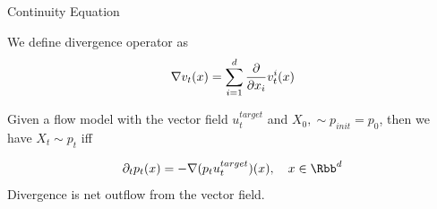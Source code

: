 \documentclass[aspectratio=169,xcolor=dvipsnames,svgnames,x11names,fleqn]{beamer}
\begin{document}
\begin{frame}{Continuity Equation}

    We define divergence operator as
    \begin{align*}
        \nabla v_t(x) = \sum_{i=1}^d \pdv{}{x_i} v_t^i(x)
    \end{align*}

    \begin{tcolorbox}[enhanced, sharp corners, boxrule=0.0pt, leftrule = 0.0em, toprule = 0.0em, colframe=black!50, colback=cashyellow!20,
        title = Continuity Equation, left=1mm ]

        Given a flow model with the vector field $u_t^{target}$ and $X_0, \sim p_{init} = p_0$, then we have $X_t \sim p_t$ iff 

        $$
        \partial_t p_t(x ) = -\nabla (p_t u_t^{target})(x), \quad x \in \Rbb^d
        $$
        Divergence is net outflow from the vector field.

    \end{tcolorbox}

    
\end{frame}
\end{document}
